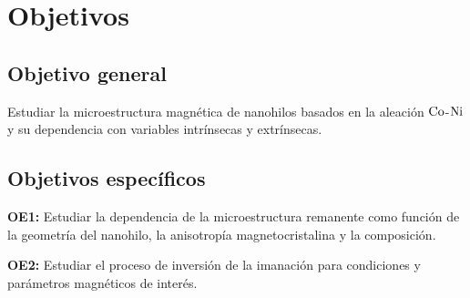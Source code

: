 \newpage
\section{Objetivos}
\subsection{Objetivo general}
Estudiar la microestructura magnética de nanohilos basados en la aleación $\ce{Co}$-$\ce{Ni}$ y su dependencia con variables intrínsecas y extrínsecas.
\subsection{Objetivos específicos}
    \textbf{OE1:} Estudiar la dependencia de la microestructura remanente como función de la geometría del nanohilo, la anisotropía magnetocristalina y la composición.

    \vspace{10pt}

    \textbf{OE2:} Estudiar el proceso de inversión de la imanación para condiciones y parámetros magnéticos de interés.
